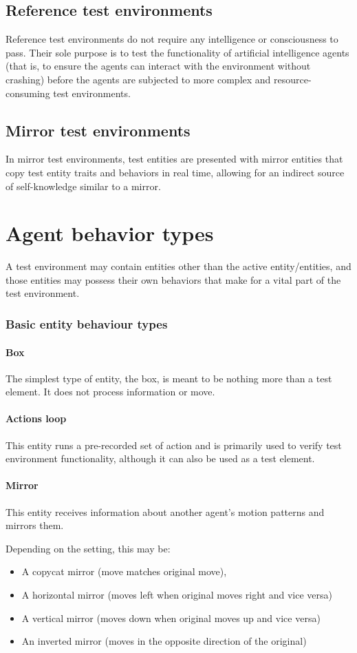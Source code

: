 \documentclass[masterthesis]{fer}
\begin{document}
\subsection{Reference test environments}
Reference test environments do not require any intelligence or consciousness to pass.
Their sole purpose is to test the functionality of artificial intelligence agents
(that is, to ensure the agents can interact with the environment without crashing)
before the agents are subjected to more complex and resource-consuming test environments.
\subsection{Mirror test environments}
In mirror test environments, test entities are presented with mirror entities that copy test entity traits and behaviors in real time, allowing for an indirect source of self-knowledge similar to a mirror.
\section{Agent behavior types}

A test environment may contain entities other than the active entity/entities,
and those entities may possess their own behaviors that make for a vital part of the test environment.
\subsubsection{Basic entity behaviour types}
\paragraph{Box}
The simplest type of entity, the box, is meant to be nothing more than a test element. It does not process information or move.
\paragraph{Actions loop}
This entity runs a pre-recorded set of action and is primarily used to verify test environment functionality, although it can also be used as a test element.
\paragraph{Mirror}
This entity receives information about another agent's motion patterns and mirrors them.

Depending on the setting, this may be:
\begin{itemize}
\item A copycat mirror (move matches original move),
\item A horizontal mirror (moves left when original moves right and vice versa)
\item A vertical mirror (moves down when original moves up and vice versa)
\item An inverted mirror (moves in the opposite direction of the original)
\end{itemize}
 
\end{document}
